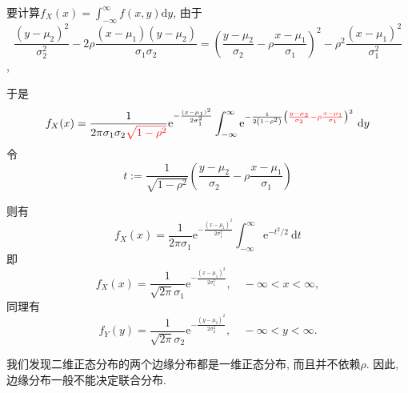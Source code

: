 \begin{solution}
  要计算$f_X(x)=\int_{-\infty}^{\infty} f(x, y) \mathrm{d} y$, 由于
            $$\frac{\left(y-\mu_2\right)^2}{\sigma_2^2}-2 \rho \frac{\left(x-\mu_1\right)\left(y-\mu_2\right)}{\sigma_1 \sigma_2}=\left(\frac{y-\mu_2}{\sigma_2}-\rho \frac{x-\mu_1}{\sigma_1}\right)^2-\rho^2 \frac{\left(x-\mu_1\right)^2}{\sigma_1^2}$$,

            于是$$f_X(x)=\frac{1}{2 \pi \sigma_1 \sigma_2 {\color{red}\sqrt{1-\rho^2}}} \mathrm{e}^{-\frac{\left(x-\mu_1\right)^2}{2 \sigma_1^2}} \int_{-\infty}^{\infty} \mathrm{e}^{-\frac{1}{2\left(1-\rho^2\right)}\left({\color{red}\frac{y-\mu_2}{\sigma_2}-\rho \frac{x-\mu_1}{\sigma_1}}\right)^2} \mathrm{~d} y$$
        令 $$t:=\frac{1}{\sqrt{1-\rho^2}}\left(\frac{y-\mu_2}{\sigma_2}-\rho \frac{x-\mu_1}{\sigma_1}\right)$$

        则有$$f_X(x)=\frac{1}{2 \pi \sigma_1} \mathrm{e}^{-\frac{\left(x-\mu_1\right)^2}{2 \sigma_1^2}} \int_{-\infty}^{\infty} \mathrm{e}^{-t^2 / 2} \mathrm{~d} t$$
        即 $$f_X(x)=\frac{1}{\sqrt{2 \pi} \sigma_1} \mathrm{e}^{-\frac{\left(x-\mu_1\right)^2}{2 \sigma_1^2}}, \quad-\infty<x<\infty,$$
        同理有
        \small $$f_Y(y)=\frac{1}{\sqrt{2 \pi} \sigma_2} \mathrm{e}^{-\frac{\left(y-\mu_2\right)^2}{2 \sigma_2^2}}, \quad-\infty<y<\infty.$$

        我们发现二维正态分布的两个边缘分布都是一维正态分布, 而且并不依赖$\rho$. 
        因此, 边缘分布一般不能决定联合分布. 
\end{solution}




